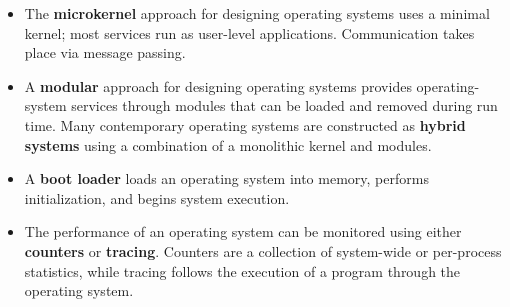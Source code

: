 \begin{itemize}
    \item The \textbf{microkernel} approach for designing operating systems uses a minimal kernel; most services run as user-level applications. Communication takes place via message passing.
    \item A \textbf{modular} approach for designing operating systems provides operating-system services through modules that can be loaded and removed during run time. Many contemporary operating systems are constructed as \textbf{hybrid systems} using a combination of a monolithic kernel and modules.
    \item A \textbf{boot loader} loads an operating system into memory, performs initialization, and begins system execution.
    \item The performance of an operating system can be monitored using either \textbf{counters} or \textbf{tracing}. Counters are a collection of system-wide or per-process statistics, while tracing follows the execution of a program through the operating system.
\end{itemize}

